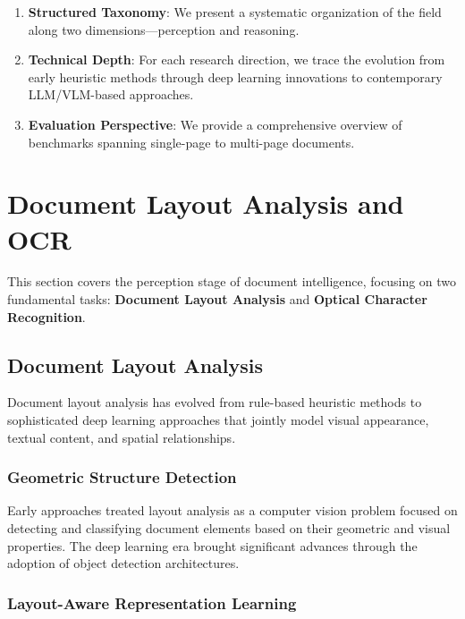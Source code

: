 \documentclass[]{style}
\begin{document}
\begin{enumerate}[leftmargin=*]
    \item \textbf{Structured Taxonomy}: We present a systematic organization of the field along two dimensions---perception and reasoning.
    \item \textbf{Technical Depth}: For each research direction, we trace the evolution from early heuristic methods through deep learning innovations to contemporary LLM/VLM-based approaches.
    \item \textbf{Evaluation Perspective}: We provide a comprehensive overview of benchmarks spanning single-page to multi-page documents.
\end{enumerate}


\section{Document Layout Analysis and OCR}
\label{sec:layout_ocr}

This section covers the perception stage of document intelligence, focusing on two fundamental tasks: \textbf{Document Layout Analysis} and \textbf{Optical Character Recognition}.

\subsection{Document Layout Analysis}

Document layout analysis has evolved from rule-based heuristic methods to sophisticated deep learning approaches that jointly model visual appearance, textual content, and spatial relationships.

\subsubsection{Geometric Structure Detection}

Early approaches treated layout analysis as a computer vision problem focused on detecting and classifying document elements based on their geometric and visual properties. The deep learning era brought significant advances through the adoption of object detection architectures.

\subsubsection{Layout-Aware Representation Learning}
\end{document}
